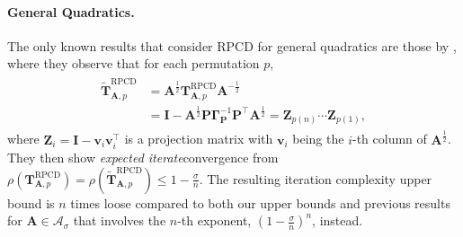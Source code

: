\documentclass{article}
\theoremstyle{plain}
\theoremstyle{definition}
\theoremstyle{remark}
\def\bigopen#1{\left(#1\right)}
\newcommand{\mGamma}{\bm{\Gamma}}
\def\vv{{\bm{v}}}
\def\mA{{\bm{A}}}
\def\mI{{\bm{I}}}
\def\mP{{\bm{P}}}
\def\mT{{\bm{T}}}
\def\mZ{{\bm{Z}}}
\def\gA{{\mathcal{A}}}
\begin{document}
\paragraph{General Quadratics.}
The only known results that consider RPCD for general quadratics are those by \citet{sun20}, where they observe that for each permutation $p$,
\begin{align}
    \begin{aligned}
    \widetilde{\mT}_{\mA, p}^{\text{RPCD}} &= \mA^{\frac12} \mT_{\mA, p}^{\text{RPCD}} \mA^{-\frac12} \\
    &= \mI - \mA^{\frac12} \mP \mGamma_{\mP}^{-1} \mP^{\top} \mA^{\frac12} = \mZ_{p(n)} \cdots \mZ_{p(1)}, 
    \end{aligned}\label{eq:matrixamgm}
\end{align}
where $\mZ_{i} = \mI - \vv_{i} \vv_{i}^{\top}$ is a projection matrix with $\vv_{i}$ being the $i$-th column of $\mA^{\frac12}$.
They then show \textit{expected iterate}\footnotemark[2] convergence from $\rho(\mT_{\mA, p}^{\text{RPCD}}) = \rho(\widetilde{\mT}_{\mA, p}^{\text{RPCD}}) \le 1 - \frac{\sigma}{n}$.
The resulting iteration complexity upper bound is $n$ times loose compared to both our upper bounds and previous results for $\mA \in \gA_{\sigma}$ that involves the $n$-th exponent, $(1 - \frac{\sigma}{n})^n$, instead.
\end{document}
